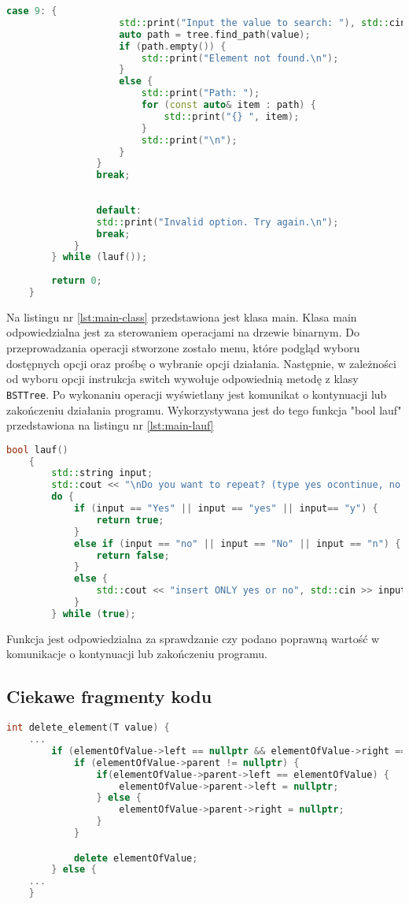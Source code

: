 \begin{lstlisting}[caption=Klasa \texttt{main}, label={lst:main-class}, language=C++]
				case 9: {
					std::print("Input the value to search: "), std::cin >> value;
					auto path = tree.find_path(value);
					if (path.empty()) {
						std::print("Element not found.\n");
					}
					else {
						std::print("Path: ");
						for (const auto& item : path) {
							std::print("{} ", item);
						}
						std::print("\n");
					}
				}
				break;
				
				
				default:
				std::print("Invalid option. Try again.\n");
				break;
			}
		} while (lauf());
		
		return 0;
	}
\end{lstlisting}
Na listingu nr \ref{lst:main-class} przedstawiona jest klasa main. Klasa main odpowiedzialna jest za sterowaniem operacjami na drzewie binarnym. Do przeprowadzania operacji stworzone zostało menu, które podgląd wyboru dostępnych opcji oraz prośbę o wybranie opcji działania.
Następnie, w zależności od wyboru opcji instrukcja switch wywołuje odpowiednią metodę z klasy \texttt{BSTTree}.
Po wykonaniu operacji wyświetlany jest komunikat o kontynuacji lub zakończeniu działania programu. Wykorzystywana jest do tego funkcja "bool lauf" przedstawiona na listingu nr \ref{lst:main-lauf}
\begin{lstlisting}[caption=Funkcja \texttt{lauf()}, label={lst:main-lauf}, language=C++]
	bool lauf()
	{
		std::string input;
		std::cout << "\nDo you want to repeat? (type yes ocontinue, no to stop): ", std::cin >> input;
		do {
			if (input == "Yes" || input == "yes" || input== "y") {
				return true;
			}
			else if (input == "no" || input == "No" || input == "n") {
				return false;
			}
			else {
				std::cout << "insert ONLY yes or no", std::cin >> input;
			}
		} while (true);
\end{lstlisting}
Funkcja jest odpowiedzialna za sprawdzanie czy podano poprawną wartość w komunikacje o kontynuacji lub zakończeniu programu.

\subsection{Ciekawe fragmenty kodu}

\begin{lstlisting}[caption=Metoda \texttt{delete\_element()}, label={lst:delete_element_excerpt}, language=C++]
	int delete_element(T value) {
	...
		if (elementOfValue->left == nullptr && elementOfValue->right == nullptr) {
			if (elementOfValue->parent != nullptr) {
				if(elementOfValue->parent->left == elementOfValue) {
					elementOfValue->parent->left = nullptr;
				} else {
					elementOfValue->parent->right = nullptr;
				}
			}

			delete elementOfValue;
		} else {
	...
	}
\end{lstlisting}

